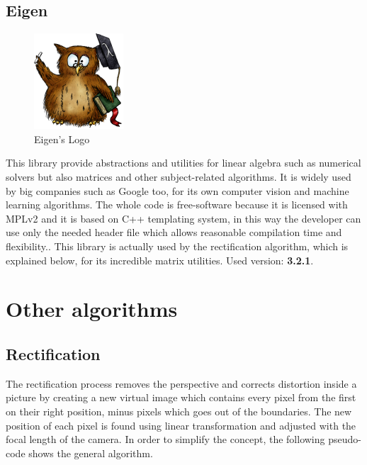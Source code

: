 \subsection{Eigen}

\begin{figure}[hbt]
    \centering
    \includegraphics[scale=0.5]{img/eigen.png}
    \caption{Eigen's Logo}
\end{figure}

This library provide abstractions and utilities for linear algebra such as numerical solvers but also matrices and other subject-related algorithms.
It is widely used by big companies such as Google too, for its own computer vision and machine learning algorithms.
The whole code is free-software because it is licensed with MPLv2 and it is based on C++ templating system, in this way the developer can use only the needed header file which allows reasonable compilation time and flexibility.\cite{eigeninfo}.
This library is actually used by the rectification algorithm, which is explained below, for its incredible matrix utilities.
\newline Used version: \textbf{3.2.1}.

\section{Other algorithms}

\subsection{Rectification}
The rectification process removes the perspective and corrects distortion inside a picture by creating a new virtual image which contains every pixel from the first on their right position, minus pixels which goes out of the boundaries.
The new position of each pixel is found using linear transformation and adjusted with the focal length of the camera.
In order to simplify the concept, the following pseudo-code shows the general algorithm.

